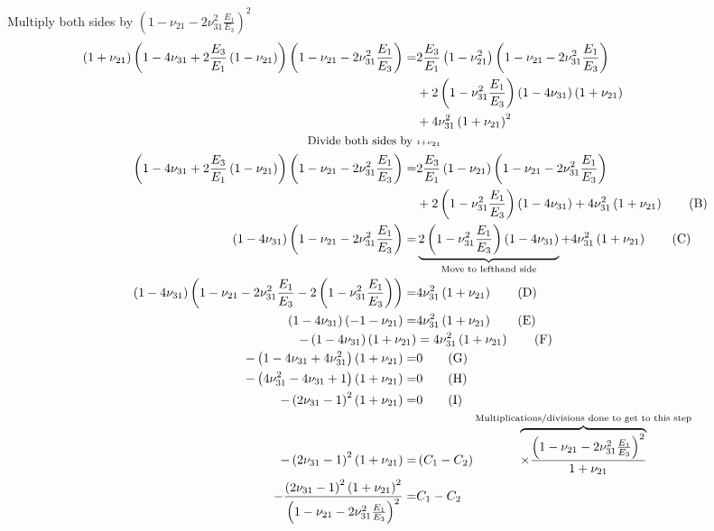 \documentclass{article}
\begin{document}
Multiply both sides by $\left( 1-\nu_{21}-2\nu_{31}^2\frac{E_1}{E_3} \right)^2$
\begin{align*} 
\left( 1+\nu_{21} \right) \left( 1-4\nu_{31} + 2 \frac{E_3}{E_1} \left( 1-\nu_{21} \right) \right)  \left( 1-\nu_{21}-2\nu_{31}^2\frac{E_1}{E_3}  \right)
=&  2 \frac{E_3}{E_1} \left( 1-\nu_{21}^2 \right) \left( 1-\nu_{21}-2\nu_{31}^2\frac{E_1}{E_3}  \right) \\
&+ 2 \left( 1-\nu_{31}^2 \frac{E_1}{E_3} \right) \left(1-4\nu_{31} \right) \left(1+\nu_{21}\right)  \\
&+ 4\nu_{31}^2 \left( 1+\nu_{21} \right)^2   \\
\small{\text{Divide both sides by }}&\scriptscriptstyle{1+\nu_{21}}
\\ 
{\left( 1-4\nu_{31} + 2 \frac{E_3}{E_1} \left( 1-\nu_{21} \right) \right)  \left( 1-\nu_{21}-2\nu_{31}^2\frac{E_1}{E_3}  \right) }
=& 
2 \frac{E_3}{E_1} \left( 1-\nu_{21} \right) \left( 1-\nu_{21}-2\nu_{31}^2\frac{E_1}{E_3}  \right) \\
&+ 2\left( 1-\nu_{31}^2 \frac{E_1}{E_3} \right) \left(1-4\nu_{31} \right) + 4\nu_{31}^2 \left( 1+\nu_{21} \right) 
\tag{B} \\
\left( 1-4\nu_{31} \right)  \left( 1-\nu_{21}-2\nu_{31}^2\frac{E_1}{E_3}  \right)
=&
\underbrace{2\left( 1-\nu_{31}^2 \frac{E_1}{E_3} \right) \left(1-4\nu_{31} \right)}_{\text{Move to lefthand side}} + 4\nu_{31}^2 \left( 1+\nu_{21} \right) 
\tag{C} \\
\left( 1-4\nu_{31} \right)  \left( 1-\nu_{21}-2\nu_{31}^2\frac{E_1}{E_3} -2\left( 1-\nu_{31}^2 \frac{E_1}{E_3} \right) \right)
=&
4\nu_{31}^2 \left( 1+\nu_{21} \right) 
\tag{D} \\
\left( 1-4\nu_{31} \right)  \left( -1- \nu_{21}\right) =& 4\nu_{31}^2 \left( 1+\nu_{21} \right) 
\tag{E} \\
-\left( 1-4\nu_{31} \right) \left(1+\nu_{21}\right)  &= 4\nu_{31}^2 \left( 1+\nu_{21} \right)  
\tag{F} \\
-\left( 1-4\nu_{31} +4\nu_{31}^2 \right) \left(1+\nu_{21}\right)  =& 0 
\tag{G}  \\
-\left( 4\nu_{31}^2-4\nu_{31}+1 \right) \left(1+\nu_{21}\right)  =& 0 
\tag{H} \\
-\left( 2\nu_{31}-1 \right)^2 \left(1+\nu_{21}\right)  =& 0   
\tag{I} \\
-\left( 2\nu_{31}-1 \right)^2 \left(1+\nu_{21}\right)  =& \left( C_1-C_2 \right) \overbrace{ \times \frac{\left( 1-\nu_{21}-2\nu_{31}^2\frac{E_1}{E_3}  \right)^2}{ 1+\nu_{21} } }^{\text{Multiplications/divisions } \text{done to get to this step}} \\
-\frac{ \left( 2\nu_{31}-1 \right)^2 \left(1+\nu_{21}\right)^2 }{\left( 1-\nu_{21}-2\nu_{31}^2\frac{E_1}{E_3}  \right)^2} =& C_1-C_2   
\end{align*}
\end{document}
